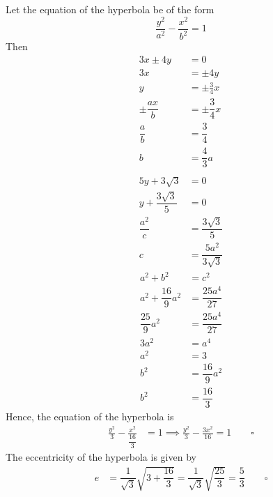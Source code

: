 \documentclass{report}
\newcommand{\eos}{ \qquad \square}
\begin{document}
\begin{enumerate}
          Let the equation of the hyperbola be of the form
          \begin{equation*}
              \frac{y^2}{a^2} - \frac{x^2}{b^2} = 1
          \end{equation*}
          Then
          \begin{align*}
              3x \pm 4y                & = 0                       \\
              3x                       & = \pm4y                   \\
              y                        & = \pm\frac{3}{4}x         \\
              \pm\dfrac{ax}{b}         & = \pm\dfrac{3}{4}x        \\
              \dfrac{a}{b}             & = \dfrac{3}{4}            \\
              b                        & = \dfrac{4}{3}a           \\
              \\
              5y + 3\sqrt{3}           & = 0                       \\
              y + \dfrac{3\sqrt{3}}{5} & = 0                       \\
              \dfrac{a^2}{c}           & = \dfrac{3\sqrt{3}}{5}    \\
              c                        & = \dfrac{5a^2}{3\sqrt{3}}
          \end{align*}
          \begin{align*}
              a^2 + b^2              & = c^2               \\
              a^2 + \dfrac{16}{9}a^2 & = \dfrac{25a^4}{27} \\
              \dfrac{25}{9}a^2       & = \dfrac{25a^4}{27} \\
              3a^2                   & = a^4               \\
              a^2                    & = 3                 \\
              b^2                    & = \dfrac{16}{9}a^2  \\
              b^2                    & = \dfrac{16}{3}
          \end{align*}
          Hence, the equation of the hyperbola is
          \begin{align*}
              \frac{y^2}{3} - \frac{x^2}{\dfrac{16}{3}} & = 1 \implies \frac{y^2}{3} - \frac{3x^2}{16} = 1 \eos
          \end{align*}
          The eccentricity of the hyperbola is given by
          \begin{align*}
              e & = \dfrac{1}{\sqrt{3}}\sqrt{3 + \dfrac{16}{3}} = \dfrac{1}{\sqrt{3}}\sqrt{\dfrac{25}{3}} = \dfrac{5}{3} \eos
          \end{align*}


\end{enumerate}
\end{document}
